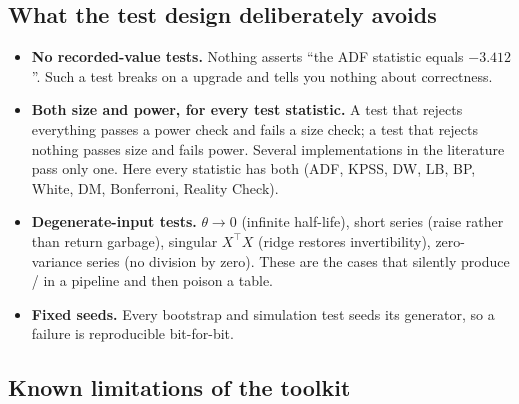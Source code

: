 \subsection{What the test design deliberately avoids}

\begin{itemize}
  \item \textbf{No recorded-value tests.} Nothing asserts ``the ADF statistic equals
    $-3.412$''. Such a test breaks on a  upgrade and tells you nothing
    about correctness.
  \item \textbf{Both size and power, for every test statistic.} A test that rejects
    everything passes a power check and fails a size check; a test that rejects nothing
    passes size and fails power. Several implementations in the literature pass only one.
    Here every statistic has both (ADF, KPSS, DW, LB, BP, White, DM, Bonferroni, Reality
    Check).
  \item \textbf{Degenerate-input tests.} $\theta\to0$ (infinite half-life), short series
    (raise rather than return garbage), singular $X^{\top}X$ (ridge restores invertibility),
    zero-variance series (no division by zero). These are the cases that silently produce
    / in a pipeline and then poison a table.
  \item \textbf{Fixed seeds.} Every bootstrap and simulation test seeds its generator, so a
    failure is reproducible bit-for-bit.
\end{itemize}

\subsection{Known limitations of the toolkit}

